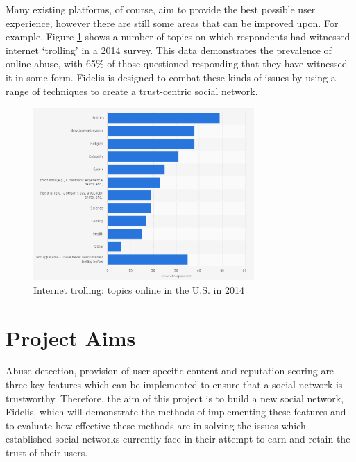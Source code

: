 Many existing platforms, of course, aim to provide the best possible user experience, however there are still some areas that can be improved upon. For example, Figure \ref{fig:TrollingByTopic} shows a number of topics on which respondents had witnessed internet `trolling' in a 2014 survey. This data demonstrates the prevalence of online abuse, with 65\% of those questioned responding that they have witnessed it in some form. Fidelis is designed to combat these kinds of issues by using a range of techniques to create a trust-centric social network.

\begin{figure}[H]
  \centering
  \includegraphics[width=0.75\textwidth]{Images/Introduction/TrollingByTopic}
  \caption{Internet trolling: topics online in the U.S. in 2014 \cite{Statista:TrollingByTopic}} \label{fig:TrollingByTopic} 
\end{figure}

\section{Project Aims}
Abuse detection, provision of user-specific content and reputation scoring are three key features which can be implemented to ensure that a social network is trustworthy. Therefore, the aim of this project is to build a new social network, Fidelis, which will demonstrate the methods of implementing these features and to evaluate how effective these methods are in solving the issues which established social networks currently face in their attempt to earn and retain the trust of their users.

